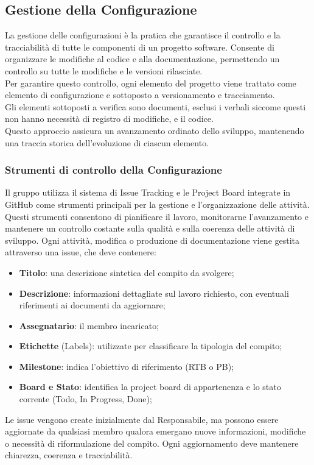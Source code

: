 \subsection{Gestione della Configurazione}
\label{sec:gestione-configurazione}
La gestione delle configurazioni è la pratica che garantisce il controllo e la tracciabilità di tutte le componenti di un progetto software. Consente di organizzare le modifiche al codice e alla documentazione, permettendo un controllo su tutte le modifiche e le versioni rilasciate.\\
Per garantire questo controllo, ogni elemento del progetto viene trattato come elemento di configurazione e sottoposto a versionamento e tracciamento.\\
Gli elementi sottoposti a verifica sono documenti, esclusi i verbali siccome questi non hanno necessità di registro di modifiche, e il codice.\\
Questo approccio assicura un avanzamento ordinato dello sviluppo, mantenendo una traccia storica dell’evoluzione di ciascun elemento.

\subsubsection{Strumenti di controllo della Configurazione}
\label{sec:ticketing}
Il gruppo utilizza il sistema di Issue Tracking e le Project Board integrate in GitHub come strumenti principali per la gestione e l’organizzazione delle attività.\\
Questi strumenti consentono di pianificare il lavoro, monitorarne l’avanzamento e mantenere un controllo costante sulla qualità e sulla coerenza delle attività di sviluppo.
Ogni attività, modifica o produzione di documentazione viene gestita attraverso una issue, che deve contenere:
\begin{itemize}[itemsep=3pt, parsep=1pt, label=$\scriptstyle\bullet$]
    \item \textbf{Titolo}: una descrizione sintetica del compito da svolgere;
    \item \textbf{Descrizione}: informazioni dettagliate sul lavoro richiesto, con eventuali riferimenti ai documenti da aggiornare;
    \item \textbf{Assegnatario}: il membro incaricato;
    \item \textbf{Etichette} (Labels): utilizzate per classificare la tipologia del compito;
    \item \textbf{Milestone}: indica l’obiettivo di riferimento (RTB o PB);
    \item \textbf{Board e Stato}: identifica la project board di appartenenza e lo stato corrente (Todo, In Progress, Done);
\end{itemize}
Le issue vengono create inizialmente dal Responsabile, ma possono essere aggiornate da qualsiasi membro qualora emergano nuove informazioni, modifiche o necessità di riformulazione del compito. Ogni aggiornamento deve mantenere chiarezza, coerenza e tracciabilità.\\

